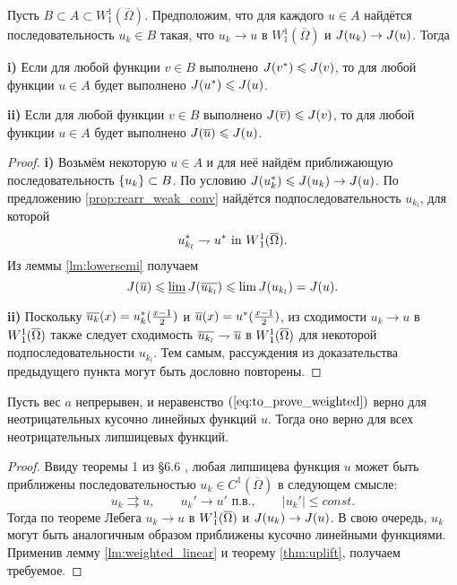 \begin{thm}
\label{thm:uplift}
Пусть $B \subset A \subset W^1_1(\overline{\Omega})$.
Предположим, что для каждого $u \in A$ найдётся последовательность $u_k \in B$ такая,
что $u_k \to u$ в $W^1_1(\overline{\Omega})$ и $J( u_k ) \to J( u )$.
Тогда

\textbf{\textup{i)}}
Если для любой функции $v \in B$ выполнено $J( {v^*} ) \leqslant J( v )$,
то для любой функции $u \in A$ будет выполнено $J( {u^*} ) \leqslant J( u )$.

\textbf{\textup{ii)}}
Если для любой функции $v \in B$ выполнено $\IWg( \mon{v} ) \le \IWg( v )$,
то для любой функции $u \in A$ будет выполнено $\IWg( \mon{u} ) \le \IWg( u )$.
\end{thm}

\begin{proof}
\textbf{\textup{i)}}
Возьмём некоторую $u \in A$ и для неё найдём приближающую последовательность $\{u_k\} \subset B$.
По условию $J({u_k^*}) \leqslant J(u_k) \to J(u)$.
По предложению \ref{prop:rearr_weak_conv} найдётся подпоследовательность $u_{k_l}$, для которой
$$
\symm{u_{k_l}} \rightharpoondown \symm{u} \text{ in } \W(\overline{\Omega}).
$$
Из леммы \ref{lm:lowersemi} получаем
$$
\IWg(\mon{u}) \le \varliminf \IWg(\mon{u_{k_l}}) \le \lim \IWg(u_{k_l}) = \IWg(u).
$$

\textbf{\textup{ii)}}
Поскольку $\mon{u_k}( x ) = \symm{u_k}( \frac{x - 1}{2} )$ и $\mon{u}( x ) = \symm{u}( \frac{x - 1}{2} )$,
из сходимости $u_k \to u$ в $\W(\overline{\Omega})$ также следует сходимость $\mon{u_{k_l}} \rightharpoondown \mon{u}$ в $\W(\overline{\Omega})$
для некоторой подпоследовательности $u_{k_l}$.
Тем самым, рассуждения из доказательства предыдущего пункта могут быть дословно повторены.
\end{proof}

\begin{cor}
Пусть вес $a$ непрерывен, и неравенство $(\ref{eq:to_prove_weighted})$ верно для неотрицательных кусочно линейных функций $u$.
Тогда оно верно для всех неотрицательных липшицевых функций.
\end{cor}
\begin{proof}
Ввиду теоремы 1 из \S6.6 \cite{Gariepy},
любая липшицева функция $u$ может быть приближены последовательностью $u_k \in C^1(\overline{\Omega})$ в следующем смысле:
$$
u_k \rightrightarrows u, \qquad u_k' \to u' \text{ п.в.}, \qquad |u_k'| \le const.
$$
Тогда по теореме Лебега $u_k \to u$ в $\W(\overline{\Omega})$ и $J( u_k ) \to J( u )$.
В свою очередь, $u_k$ могут быть аналогичным образом приближены кусочно линейными функциями.
Применив лемму \ref{lm:weighted_linear} и теорему \ref{thm:uplift}, получаем требуемое.
\end{proof}
